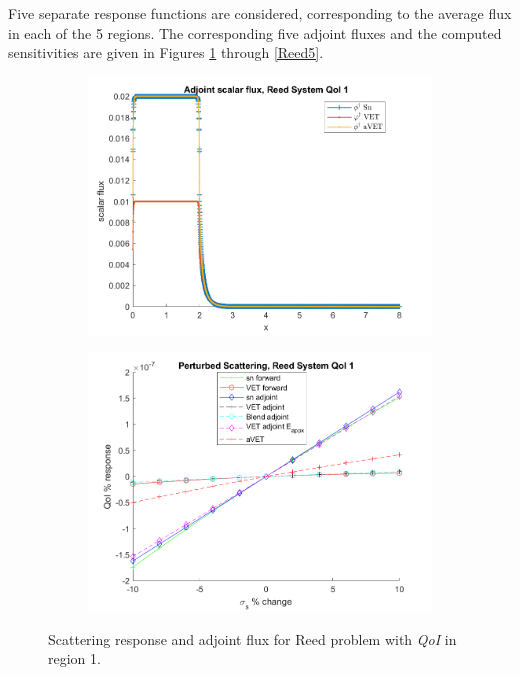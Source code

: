 \documentclass[12pt]{report}
\newcommand{\qoi}{{\it QoI}\xspace}
\begin{document}
Five separate response functions are considered, corresponding to the average flux in each of the 5 regions. 
The corresponding five adjoint fluxes and the computed sensitivities are given in Figures \ref{Reed1} through \ref{Reed5}.
\begin{figure}[H]
\centering
\begin{subfigure}{.5\textwidth}
  \centering
  \includegraphics[width=.98\linewidth]{figures2/770phia.png}
\end{subfigure}%
\begin{subfigure}{.5\textwidth}
  \centering
  \includegraphics[width=.98\linewidth]{figures2/770sigsSens.png}
\end{subfigure}
\caption{Scattering response and adjoint flux for Reed problem with \qoi in region 1.}
\label{Reed1}
\end{figure}
\end{document}
